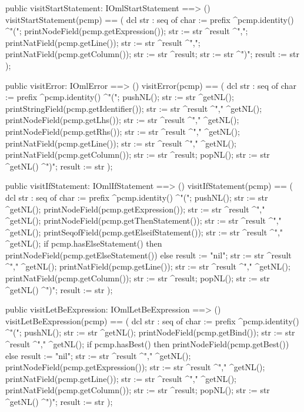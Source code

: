 \begin{vdm_al}
  public visitStartStatement: IOmlStartStatement ==> ()
  visitStartStatement(pcmp) ==
    ( dcl str : seq of char := prefix ^pcmp.identity() ^"(";
      printNodeField(pcmp.getExpression());
      str := str ^result ^",";
      printNatField(pcmp.getLine());
      str := str ^result ^",";
      printNatField(pcmp.getColumn());
      str := str ^result;
      str := str ^")";
      result := str );

  public visitError: IOmlError ==> ()
  visitError(pcmp) ==
    ( dcl str : seq of char := prefix ^pcmp.identity() ^"(";
      pushNL();
      str := str ^getNL();
      printStringField(pcmp.getIdentifier());
      str := str ^result ^"," ^getNL();
      printNodeField(pcmp.getLhs());
      str := str ^result ^"," ^getNL();
      printNodeField(pcmp.getRhs());
      str := str ^result ^"," ^getNL();
      printNatField(pcmp.getLine());
      str := str ^result ^"," ^getNL();
      printNatField(pcmp.getColumn());
      str := str ^result;
      popNL();
      str := str ^getNL() ^")";
      result := str );

  public visitIfStatement: IOmlIfStatement ==> ()
  visitIfStatement(pcmp) ==
    ( dcl str : seq of char := prefix ^pcmp.identity() ^"(";
      pushNL();
      str := str ^getNL();
      printNodeField(pcmp.getExpression());
      str := str ^result ^"," ^getNL();
      printNodeField(pcmp.getThenStatement());
      str := str ^result ^"," ^getNL();
      printSeqofField(pcmp.getElseifStatement());
      str := str ^result ^"," ^getNL();
      if pcmp.hasElseStatement()
      then printNodeField(pcmp.getElseStatement())
      else result := "nil";
      str := str ^result ^"," ^getNL();
      printNatField(pcmp.getLine());
      str := str ^result ^"," ^getNL();
      printNatField(pcmp.getColumn());
      str := str ^result;
      popNL();
      str := str ^getNL() ^")";
      result := str );

  public visitLetBeExpression: IOmlLetBeExpression ==> ()
  visitLetBeExpression(pcmp) ==
    ( dcl str : seq of char := prefix ^pcmp.identity() ^"(";
      pushNL();
      str := str ^getNL();
      printNodeField(pcmp.getBind());
      str := str ^result ^"," ^getNL();
      if pcmp.hasBest()
      then printNodeField(pcmp.getBest())
      else result := "nil";
      str := str ^result ^"," ^getNL();
      printNodeField(pcmp.getExpression());
      str := str ^result ^"," ^getNL();
      printNatField(pcmp.getLine());
      str := str ^result ^"," ^getNL();
      printNatField(pcmp.getColumn());
      str := str ^result;
      popNL();
      str := str ^getNL() ^")";
      result := str );


\end{vdm_al}
